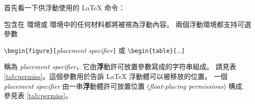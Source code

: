 \bigskip
首先看一下供浮動使用的 \LaTeX{} 命令：

包含在  環境或  環境中的任何材料都將被視為浮動內容。
兩個浮動環境都支持可選參數
\begin{lscommand}
\verb|\begin{figure}[|\emph{placement specifier}\verb|]| 或 \verb|\begin{table}[|\ldots\verb|]|
\end{lscommand}
\noindent 稱為 \emph{placement specifier}，它由{\textbf
浮動許可放置參數}寫成的字符串組成。
請見表 \ref{tab:permiss}。這個參數用於告訴
 \LaTeX{} 浮動體可以被移放的位置。 一個 \emph{placement
specifier} 由一串{\textbf 浮動體許可放置位置} (\emph{float-placing
permissions}) 構成. 參見表 \ref{tab:permiss}。

